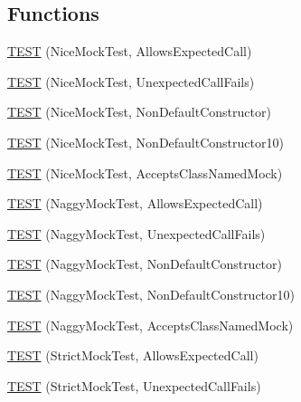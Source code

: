 \subsection*{Functions}
\begin{DoxyCompactItemize}
\item 
\hyperlink{namespacetesting_1_1gmock__nice__strict__test_a12b9f686345faa5a646da65a67c38a44}{T\+E\+ST} (Nice\+Mock\+Test, Allows\+Expected\+Call)
\item 
\hyperlink{namespacetesting_1_1gmock__nice__strict__test_a2bad58b3a12ea95eb4a731026c576b40}{T\+E\+ST} (Nice\+Mock\+Test, Unexpected\+Call\+Fails)
\item 
\hyperlink{namespacetesting_1_1gmock__nice__strict__test_a4172e1193c21d61e34d9b2c379d2f6be}{T\+E\+ST} (Nice\+Mock\+Test, Non\+Default\+Constructor)
\item 
\hyperlink{namespacetesting_1_1gmock__nice__strict__test_a81bfeea94824935648545225f5dd3c00}{T\+E\+ST} (Nice\+Mock\+Test, Non\+Default\+Constructor10)
\item 
\hyperlink{namespacetesting_1_1gmock__nice__strict__test_a0a43059a52437e547c8fb836008b8e60}{T\+E\+ST} (Nice\+Mock\+Test, Accepts\+Class\+Named\+Mock)
\item 
\hyperlink{namespacetesting_1_1gmock__nice__strict__test_a8ae416186af77fc0d066467be92c6c86}{T\+E\+ST} (Naggy\+Mock\+Test, Allows\+Expected\+Call)
\item 
\hyperlink{namespacetesting_1_1gmock__nice__strict__test_a475ee57b7b86f3f81d50819db3dd78b4}{T\+E\+ST} (Naggy\+Mock\+Test, Unexpected\+Call\+Fails)
\item 
\hyperlink{namespacetesting_1_1gmock__nice__strict__test_a9618de98b38e8e4270873d9b2616e3e1}{T\+E\+ST} (Naggy\+Mock\+Test, Non\+Default\+Constructor)
\item 
\hyperlink{namespacetesting_1_1gmock__nice__strict__test_a982de09f3040cc5b9f457a7aa4e00652}{T\+E\+ST} (Naggy\+Mock\+Test, Non\+Default\+Constructor10)
\item 
\hyperlink{namespacetesting_1_1gmock__nice__strict__test_af147980581baec3cf492457c2d1e0276}{T\+E\+ST} (Naggy\+Mock\+Test, Accepts\+Class\+Named\+Mock)
\item 
\hyperlink{namespacetesting_1_1gmock__nice__strict__test_a269b7756fb785a84a609543700f77256}{T\+E\+ST} (Strict\+Mock\+Test, Allows\+Expected\+Call)
\item 
\hyperlink{namespacetesting_1_1gmock__nice__strict__test_ae58ab074e0f9218a727d1fec0793667e}{T\+E\+ST} (Strict\+Mock\+Test, Unexpected\+Call\+Fails)
\item 

\end{DoxyCompactItemize}
